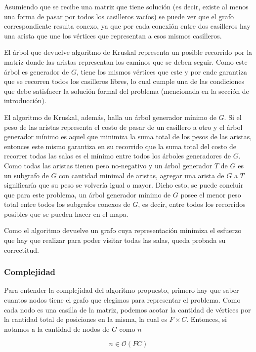 Asumiendo que se recibe una matriz que tiene solución (es decir, existe al menos una forma de pasar por todos los casilleros vacíos) se puede ver que el grafo correspondiente resulta conexo, ya que por cada conexión entre dos casilleros hay una arista que une los vértices que representan a esos mismos casilleros.

El árbol que devuelve algoritmo de Kruskal representa un posible recorrido por la matriz donde las aristas representan los caminos que se deben seguir. Como este árbol es generador de $G$, tiene los mismos vértices que este y por ende garantiza que se recorren todos los casilleros libres, lo cual cumple una de las condiciones que debe satisfacer la solución formal del problema (mencionada en la sección de introducción).

El algoritmo de Kruskal, además, halla un árbol generador mínimo de $G$. Si el peso de las aristas representa el costo de pasar de un casillero a otro y el árbol generador mínimo es aquel que minimiza la suma total de los pesos de las aristas, entonces este mismo garantiza en su recorrido que la suma total del costo de recorrer todas las salas es el mínimo entre todos los árboles generadores de $G$. Como todas las aristas tienen peso no-negativo y un árbol generador $T$ de $G$ es un subgrafo de $G$ con cantidad minimal de aristas, agregar una arista de $G$ a $T$ significaría que su peso se volvería igual o mayor. Dicho esto, se puede concluir que para este problema, un árbol generador mínimo de $G$ posee el menor peso total entre todos los subgrafos conexos de $G$, es decir, entre todos los recorridos posibles que se pueden hacer en el mapa.

Como el algoritmo devuelve un grafo cuya representación minimiza el esfuerzo que hay que realizar para poder visitar todas las salas, queda probada su correctitud. \QEDB

\subsubsection{Complejidad}

Para entender la complejidad del algoritmo propuesto, primero hay que saber cuantos nodos tiene el grafo que elegimos para representar el problema.
Como cada nodo es una casilla de la matriz, podemos acotar la cantidad de vértices por la cantidad total de posiciones en la misma, la cual es $F \times C$. Entonces, si notamos a la cantidad de nodos de $G$ como $n$

$$n \in \mathcal{O}(FC)$$

